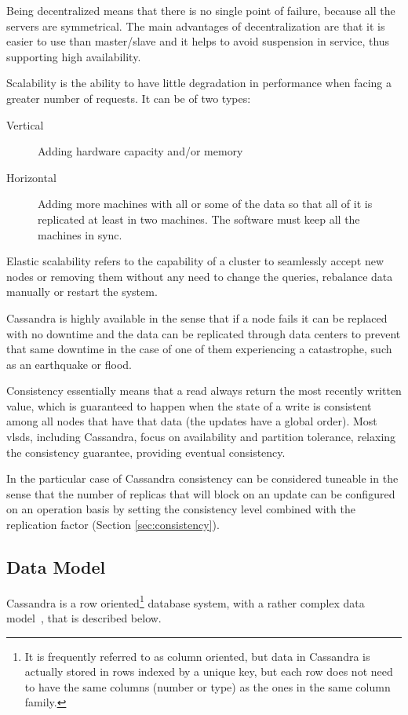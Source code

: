 Being decentralized means that there is no single point of failure, because all the servers are symmetrical. The main advantages of decentralization are that it is easier to use than master/slave and it helps to avoid suspension in service, thus supporting high availability.

Scalability is the ability to have little degradation in performance when facing a greater number of requests. It can be of two types:

\begin{description}
	\item[Vertical] Adding hardware capacity and/or memory
	\item[Horizontal] Adding more machines with all or some of the data so that all of it is replicated at least in two machines. The software must keep all the machines in sync. 
\end{description}

Elastic scalability refers to the capability of a cluster to seamlessly accept new nodes or removing them without any need to change the queries, rebalance data manually or restart the system.

Cassandra is highly available in the sense that if a node fails it can be replaced with no downtime and the data can be replicated through data centers to prevent that same downtime in the case of one of them experiencing a catastrophe, such as an earthquake or flood. 

Consistency essentially means that a read always return the most recently written value, which is guaranteed to happen when the state of a write is consistent among all nodes that have that data (the updates have a global order). Most \acp{vlsd}, including Cassandra, focus on availability and partition tolerance, relaxing the consistency guarantee, providing eventual consistency.  

In the particular case of Cassandra consistency can be considered tuneable in the sense that the number of replicas that will block on an update can be configured on an operation basis by setting the consistency level combined with the replication factor (Section \ref{sec:consistency}).


\subsection{Data Model}
\label{sec:cass_data_model}
Cassandra is a row oriented\footnote{It is frequently referred to as column oriented, but data in Cassandra is actually stored in rows indexed by a unique key, but each row does not need to have the same columns (number or type) as the ones in the same column family.} database system, with a rather complex data model~\cite{sarkissian09}, that is described below.

